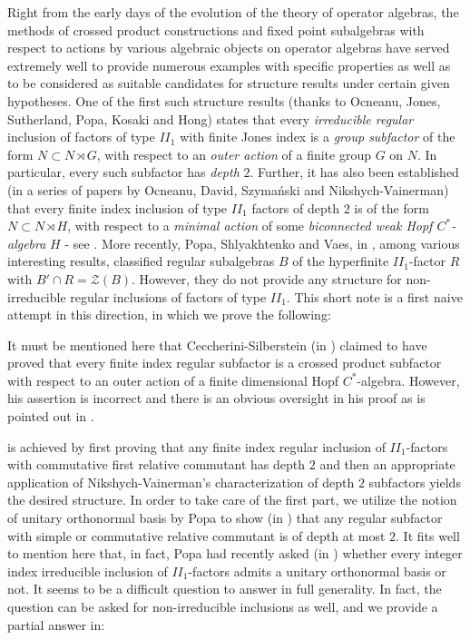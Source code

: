 \documentclass{amsart}
\theoremstyle{definition}
\theoremstyle{theorem}
\newcommand{\mz}{\mathcal{Z}}
\begin{document}
Right from the early days of the evolution of the theory of operator
algebras, the methods of crossed product constructions and fixed point
subalgebras with respect to actions by various algebraic objects on
operator algebras have served extremely well to provide numerous
examples with specific properties as well as to be considered as
suitable candidates for structure results under certain given
hypotheses. One of the first such structure results (thanks to
Ocneanu, Jones, Sutherland, Popa, Kosaki and Hong) states that every
{\it irreducible regular} inclusion of factors of type $II_1$ with
finite Jones index is a {\it group subfactor} of the form $N \subset N
\rtimes G$, with respect to an {\it outer action} of a finite group $G$
on $N$. In particular, every such subfactor has {\it depth} $2$.
Further, it has also been established (in a series of papers by
Ocneanu, David, Szyma\'{n}ski and Nikshych-Vainerman) that every finite
index inclusion of type $II_1$ factors of depth $2$ is of the form $N \subset
N \rtimes H$, with respect to a {\it minimal action} of some {\it
  biconnected weak Hopf $C^*$-algebra} $H$ - see \cite{Ocn, L, Dav,
  Szy, NV1}. More recently, Popa,  Shlyakhtenko and Vaes,
in \cite{PSV}, {among various interesting results}, classified
regular subalgebras $B$ of the hyperfinite $II_1$-factor $R$
with $B'\cap R = \mz(B)$. However, they do not provide any
structure for non-irreducible regular inclusions of factors of type
$II_1$. This short note is a first naive attempt in this direction, in which
we prove the following:\smallskip \color{black}

\smallskip 

 It must be mentioned here that Ceccherini-Silberstein (in \cite{S})
 claimed to have proved that every finite index regular
 subfactor is a crossed product subfactor with respect to an outer
 action of a finite dimensional Hopf $C^*$-algebra. However, his assertion is incorrect and there is
 an obvious oversight in his proof as is pointed out in .\smallskip


 is achieved by first proving that any finite index
regular inclusion of $II_1$-factors with commutative first relative
commutant has depth $2$ and then an appropriate application of
Nikshych-Vainerman's characterization of depth $2$ subfactors yields
the desired structure. In order to take care of the first part, we
utilize the notion of unitary orthonormal basis by Popa to show (in
) that any regular subfactor with simple or commutative
relative commutant is of depth at most $2$.  It fits well
to mention here that, in fact, Popa had recently asked 
(in \cite{pop1}) whether every integer index irreducible inclusion of
$II_1$-factors admits a unitary orthonormal basis or not. It seems to
be a difficult question to answer in full generality. In fact, the
question can be asked for non-irreducible inclusions as well, and we
provide a partial answer in:\smallskip
\end{document}
